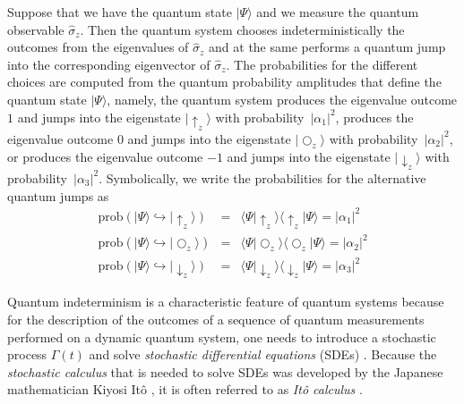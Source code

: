 \documentclass{ws-ijmpb}
\begin{document}
Suppose that we have the quantum state $\vert \Psi\rangle$ and we measure
the quantum observable $\hat{\sigma}_{z}$. Then the quantum system
chooses indeterministically the outcomes from the eigenvalues of $\hat{\sigma}_{z}$
and at the same performs a quantum jump into the corresponding eigenvector
of $\hat{\sigma}_{z}$. The probabilities for the different choices
are computed from the quantum probability amplitudes that define the
quantum state $\vert \Psi\rangle$, namely, the quantum system produces
the eigenvalue outcome $1$ and jumps into the eigenstate $\vert \uparrow_{z}\rangle$
with probability~$\vert \alpha_{1}\vert ^{2}$, produces the eigenvalue outcome
$0$ and jumps into the eigenstate $\vert \bigcirc_{z}\rangle$ with probability~$\vert \alpha_{2}\vert ^{2}$,
or produces the eigenvalue outcome $-1$ and
jumps into the eigenstate $\vert \downarrow_{z}\rangle$ with probability~$\vert \alpha_{3}\vert ^{2}$.
Symbolically, we write the probabilities for
the alternative quantum jumps as
\begin{eqnarray}
\textrm{prob}\left(\vert \Psi\rangle\hookrightarrow\vert \uparrow_{z}\rangle\right) & = & \langle\Psi\vert \uparrow_{z}\rangle\langle\uparrow_{z}\vert \Psi\rangle=\vert \alpha_{1}\vert ^{2}\\
\textrm{prob}\left(\vert \Psi\rangle\hookrightarrow\vert \bigcirc_{z}\rangle\right) & =& \langle\Psi\vert \bigcirc_{z}\rangle\langle\bigcirc_{z}\vert \Psi\rangle=\vert \alpha_{2}\vert ^{2}\\
\textrm{prob}\left(\vert \Psi\rangle\hookrightarrow\vert \downarrow_{z}\rangle\right) & =& \langle\Psi\vert \downarrow_{z}\rangle\langle\downarrow_{z}\vert \Psi\rangle=\vert \alpha_{3}\vert ^{2}
\end{eqnarray}

Quantum indeterminism is a characteristic feature of quantum systems
because for the description of the outcomes of a sequence of quantum
measurements performed on a dynamic quantum system, one needs to introduce
a stochastic process $\Gamma(t)$ and solve \emph{stochastic differential
equations} (SDEs) \cite{Gudder1979}. Because the \emph{stochastic calculus} that is
needed to solve SDEs was developed by the Japanese mathematician Kiyosi
It\^{o} \cite{Ito1944,Ito1950,Ito1975,Ito1984}, it is often referred to as \emph{It\^{o} calculus} \cite{Ikeda1996}.
\end{document}
